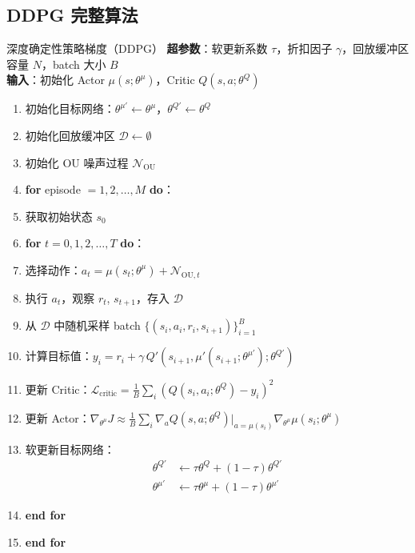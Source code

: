 \subsection{DDPG 完整算法}

\begin{myalgorithm}{深度确定性策略梯度（DDPG）}
\textbf{超参数}：软更新系数 $\tau$，折扣因子 $\gamma$，回放缓冲区容量 $N$，batch 大小 $B$\\
\textbf{输入}：初始化 Actor $\mu(s;\theta^\mu)$，Critic $Q(s,a;\theta^Q)$
\begin{enumerate}
    \item 初始化目标网络：$\theta^{\mu'} \leftarrow \theta^\mu$，$\theta^{Q'} \leftarrow \theta^Q$
    \item 初始化回放缓冲区 $\mathcal{D} \leftarrow \emptyset$
    \item 初始化 OU 噪声过程 $\mathcal{N}_{\text{OU}}$
    \item \textbf{for} episode $= 1, 2, \dots, M$ \textbf{do}：
    \item \quad 获取初始状态 $s_0$
    \item \quad \textbf{for} $t = 0, 1, 2, \dots, T$ \textbf{do}：
    \item \quad \quad 选择动作：$a_t = \mu(s_t; \theta^\mu) + \mathcal{N}_{\text{OU},t}$
    \item \quad \quad 执行 $a_t$，观察 $r_t$, $s_{t+1}$，存入 $\mathcal{D}$
    \item \quad \quad 从 $\mathcal{D}$ 中随机采样 batch $\{(s_i, a_i, r_i, s_{i+1})\}_{i=1}^{B}$
    \item \quad \quad 计算目标值：$y_i = r_i + \gamma \, Q'(s_{i+1}, \mu'(s_{i+1}; \theta^{\mu'}); \theta^{Q'})$
    \item \quad \quad 更新 Critic：$\mathcal{L}_{\text{critic}} = \frac{1}{B} \sum_i (Q(s_i, a_i; \theta^Q) - y_i)^2$
    \item \quad \quad 更新 Actor：$\nabla_{\theta^\mu} J \approx \frac{1}{B} \sum_i \nabla_a Q(s, a; \theta^Q)|_{a=\mu(s_i)} \nabla_{\theta^\mu} \mu(s_i; \theta^\mu)$
    \item \quad \quad 软更新目标网络：
    \begin{align*}
        \theta^{Q'} &\leftarrow \tau \theta^Q + (1-\tau) \theta^{Q'} \\
        \theta^{\mu'} &\leftarrow \tau \theta^\mu + (1-\tau) \theta^{\mu'}
    \end{align*}
    \item \quad \textbf{end for}
    \item \textbf{end for}
\end{enumerate}
\end{myalgorithm}

